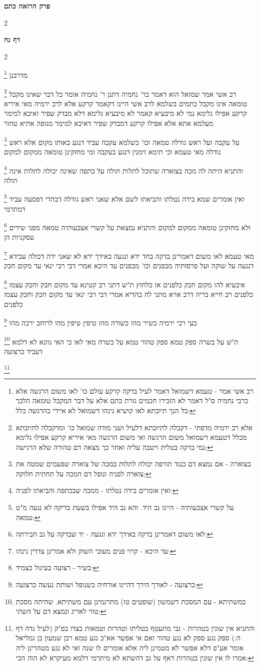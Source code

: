 \documentclass[12pt, openany]{book}
\newcommand{\sethebfont}{
\fontsize{10.5pt}{21.0pt} \selectfont
}
\newcommand{\twocol}[1]{
	{\sethebfont \begin{multicols}{2}
			#1
	\end{multicols}}	
}
\newcommand{\chapname}{}
\newcommand{\sectname}{}
\newcommand{\newchap}[1]{
	\addcontentsline{toc}{chapter}{#1}
	\renewcommand{\chapname}{#1}
		\begin{center}
			\textbf{%
\fontsize{16pt}{16pt}\selectfont
				#1}
		\end{center}
}
\newcommand{\newsection}[1]{
	\renewcommand{\sectname}{#1}	
	\vspace{-\baselineskip}
	\begin{center}
		\textbf{%
\fontsize{16pt}{16pt}\selectfont
			#1}
	\end{center}
	\vspace{-\baselineskip}
	\nopagebreak
}
\newcommand{\footnotecomment}[1]{
	\renewcommand\thefootnote{}
	\footnote{#1}}
\newcommand{\commenta}[1]{\footnotecomment{#1}}
\begin{document}
\newchap{פרק  הרואה כתם}
\twocol{\clearpage}

\newsection{דף נח}
\twocol{
\commenta{רב אשי אמר - טעמא דשמואל דאמר לעיל בדקה קרקע עולם כו' לאו משום הרגשה אלא כרבי נחמיה ס"ל דאמר לא הזכירו חכמים גזרת כתם אלא על דבר המקבל טומאה הלכך כל הנך תיובתא לאו קושיא נינהו דשמואל לא איירי בהרגשה כלל:}
מדרבנן 
\commenta{אלא רב ירמיה מדפתי - דקבלה לתיובתא דלעיל ושני מודה שמואל כו' ומדקבלה לתיובתא מכלל דטעמא דשמואל משום הרגשה ואי משום הרגשה מאי איריא קרקע אפילו גלימא נמי בדקה בטלית וישבה עליה ואחר כך מצאה דם טהורה שלא הרגישה:}
רב אשי אמר שמואל הוא דאמר כר' נחמיה דתנן ר' נחמיה אומר כל דבר שאינו מקבל טומאה אינו מקבל כתמים 
בשלמא לרב אשי היינו דקאמר קרקע אלא לרב ירמיה מאי איריא קרקע אפילו גלימא נמי לא מיבעיא קאמר
לא מיבעיא גלימא דלא מבדק שפיר ואיכא למימר מעלמא אתא אלא אפילו קרקע דמבדק שפיר דאיכא למימר מגופה אתיא טהור
\commenta{בצוארה - אם נמצא דם כנגד תורפה יכולה לתלות במכה של צוארה שפעמים שמטה את צוארה לפניה ונופל דם המכה על תחתית חלוקה:}
על עקבה ועל ראש גודלה טמאה וכו' בשלמא עקבה עביד דנגע באותו מקום אלא ראש גודלה מאי טעמא וכי תימא זימנין דנגע בעקבה ומי מחזקינן טומאה ממקום למקום 
\commenta{ואין אומרים בידה נטלתו - ממכה שבכתפה והביאתו לפניה:}
והתניא היתה לה מכה בצוארה שתוכל לתלות תולה על כתפה שאינה יכולה לתלות אינה תולה
\commenta{על קשרי אצבעותיה - היינו גב היד. והא גב היד אפילו בשעת בדיקה לא נגעה מ"ט טמאה:}
ואין אומרים שמא בידה נטלתו והביאתו לשם אלא שאני ראש גודלה דבהדי דפסעה עביד דמתרמי 
\commenta{לאו משום דאמרינן בדקה באידך ידא ונגעה - יד שבדקה על גב חבירתה:}
ולא מחזקינן טומאה ממקום למקום והתניא נמצאת על קשרי אצבעותיה טמאה מפני שידים עסקניות הן 
\commenta{עד היכא - קרוי פנים מעובי השוק ולא אמרינן צדדין נינהו:}
מאי טעמא לאו משום דאמרינן בדקה בחד ידא ונגעה באידך ידא לא שאני ידה דכולה עבידא דנגעה
על שוקה ועל פרסותיה מבפנים וכו' מבפנים עד היכא אמרי דבי רבי ינאי עד מקום חבק 
\commenta{כשיר - רצועה בעיגול כצמיד:}
איבעיא להו מקום חבק כלפנים או כלחוץ ת"ש דתני רב קטינא עד מקום חבק וחבק עצמו כלפנים רב חייא בריה דרב אויא מתני לה בהדיא אמרי דבי רבי ינאי עד מקום חבק וחבק עצמו כלפנים 
\commenta{כרצועה - לאורך הירך דהיינו אורחיה כשנופל ושותת נעשה כרצועה:}
בעי רבי ירמיה כשיר מהו כשורה מהו טיפין טיפין מהו לרוחב ירכה מהו 
\commenta{במשתיתא - עם המסכת דשמשון (שופטים טז) מתרגמינן עם משתיתא. שהיתה מסכת טווי לאריג ונמצא דם על השתי:}
ת"ש על בשרה ספק טמא ספק טהור טמא על בשרה מאי לאו כי האי גוונא לא דלמא דעביד כרצועה 
\commenta{והתניא אין שונין בטהרות - גבי מתעטף בטליתו וטהרות וטמאות בצדו בפ"ק (לעיל נדה דף ה:) ספק נגע ספק לא נגע טהור ואם אי אפשר אא"כ נגע טמא רבן שמעון בן גמליאל אומר אע"פ דלא אפשר לא מטמינן ליה אלא אומרים לו שנה ואי לא נגע מטהרינן ליה אמרו לו אין שונין בטהרות דאף על גב דהשתא לא מיתרמי דלמא מעיקרא לא הוה הכי:
}}
\end{document}
